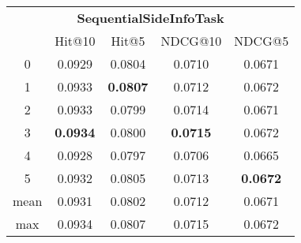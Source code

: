 \documentclass{article}
\begin{document}
 

\begin{tabular}{c|cccc}

\multicolumn{5}{c}{\textbf{SequentialSideInfoTask}} \\
\noalign{\smallskip}
\noalign{\smallskip}
\toprule
\multicolumn{1}{c}{Template ID} & \multicolumn{1}{|c}{Hit@10} & \multicolumn{1}{c}{Hit@5} & \multicolumn{1}{c}{NDCG@10} & \multicolumn{1}{c}{NDCG@5} \\
\midrule
0 & 0.0929 & 0.0804 & 0.0710 & 0.0671 \\
1 & 0.0933 & \textbf{0.0807} & 0.0712 & 0.0672 \\
2 & 0.0933 & 0.0799 & 0.0714 & 0.0671 \\
3 & \textbf{0.0934} & 0.0800 & \textbf{0.0715} & 0.0672 \\
4 & 0.0928 & 0.0797 & 0.0706 & 0.0665 \\
5 & 0.0932 & 0.0805 & 0.0713 & \textbf{0.0672} \\
\midrule
mean & 0.0931 & 0.0802 & 0.0712 & 0.0671 \\
max & 0.0934 & 0.0807 & 0.0715 & 0.0672 \\
\bottomrule

\end{tabular}
\end{document}
